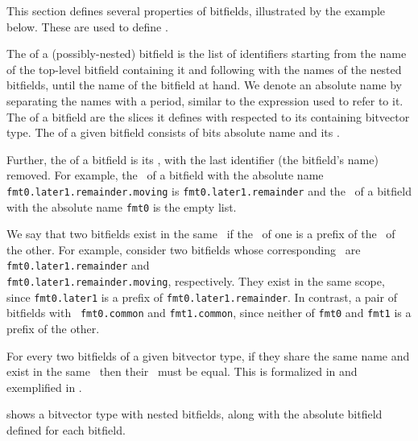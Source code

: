 This section defines several properties of bitfields, illustrated by the example below.
These are used to define .

The \hypertarget{def-absolutename}{\absolutename} of a (possibly-nested) bitfield is the list of identifiers starting from the
name of the top-level bitfield containing it and following with the names of the nested bitfields,
until the name of the bitfield at hand. We denote an absolute name by separating the names with a
period, similar to the expression used to refer to it.
%
The \hypertarget{def-absoluteslice}{\absoluteslice} of a bitfield are the slices it defines with respected to its containing
bitvector type.
%
The \hypertarget{def-absolutebitfield}{\absolutebitfield} of a given bitfield consists of bits absolute name and its
\absoluteslices.

Further, the \hypertarget{def-bitfieldscope}{\bitfieldscope} of a bitfield is its \absolutename, with the last
identifier (the bitfield's name) removed.
For example, the \bitfieldscope\ of a bitfield with the absolute name \texttt{fmt0.later1.remainder.moving}
is \texttt{fmt0.later1.remainder} and the \bitfieldscope\ of a bitfield with the absolute name
\texttt{fmt0} is the empty list.

We say that two bitfields exist in the same \bitfieldscope\ if the \bitfieldscope\ of one is a prefix
of the \bitfieldscope\ of the other. For example, consider two bitfields whose corresponding \absolutenames\ are
\texttt{fmt0.later1.remainder} and \\
\texttt{fmt0.later1.remainder.moving}, respectively.
They exist in the same scope, since \texttt{fmt0.later1} is a prefix of
\texttt{fmt0.later1.remainder}.
In contrast, a pair of bitfields with \absolutenames\ \texttt{fmt0.common}
and \texttt{fmt1.common}, since neither of \texttt{fmt0} and \texttt{fmt1} is a prefix of the other.

For every two bitfields of a given bitvector type,
if they share the same name and exist in the same \bitfieldscope\ then their \absoluteslices\ must be
equal.
This is formalized in  and exemplified in .

 shows a bitvector type with nested bitfields, along with the absolute bitfield
defined for each bitfield.


